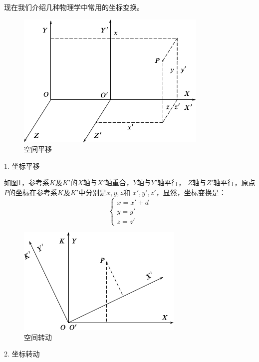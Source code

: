 现在我们介绍几种物理学中常用的坐标变换。

\begin{figure}
  \centering
  \includegraphics{figure/fig02.02}
  \caption{空间平移}
  \label{fig:02.02}
\end{figure}
\textsf{1. 坐标平移}

如图\ref{fig:02.02}，参考系$K$及$K'$的$X$轴与$X'$轴重合，$Y$轴与$Y'$轴平行，
$Z$轴与$Z'$轴平行，原点$P$的坐标在参考系$K$及$K'$中分别是$x,y,z$和
$x',y',z'$，显然，坐标变换是：
\begin{equation}\label{eqn:02.02.03}
  \left\{\begin{array}{l}
    x=x'+d \\
    y=y'   \\
    z=z'
  \end{array}\right.
\end{equation}

\begin{figure}
  \centering
  \includegraphics{figure/fig02.03}
  \caption{空间转动}
  \label{fig:02.03}
\end{figure}
\textsf{2. 坐标转动}

